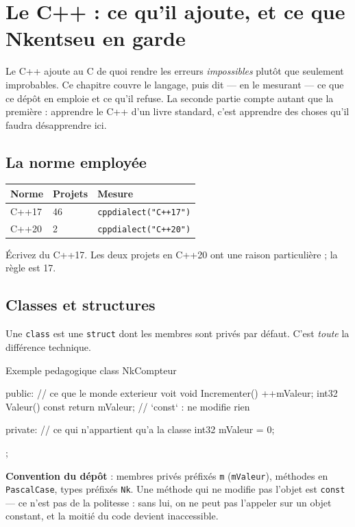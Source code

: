 \chapter{Le C++ : ce qu'il ajoute, et ce que Nkentseu en garde}

Le C++ ajoute au C de quoi rendre les erreurs \emph{impossibles} plutôt que
seulement improbables. Ce chapitre couvre le langage, puis dit --- en le mesurant
--- ce que ce dépôt en emploie et ce qu'il refuse. La seconde partie compte
autant que la première : apprendre le C++ d'un livre standard, c'est apprendre
des choses qu'il faudra désapprendre ici.

\section{La norme employée}

\begin{center}
\begin{tabular}{@{}lll@{}}
\toprule
\textbf{Norme} & \textbf{Projets} & \textbf{Mesure} \\
\midrule
C++17 & 46 & \texttt{cppdialect("C++17")} \\
C++20 & 2  & \texttt{cppdialect("C++20")} \\
\bottomrule
\end{tabular}
\end{center}

Écrivez du C++17. Les deux projets en C++20 ont une raison particulière ; la
règle est 17.

\section{Classes et structures}

Une \texttt{class} est une \texttt{struct} dont les membres sont privés par
défaut. C'est \emph{toute} la différence technique.

\begin{nkcode}{Exemple pedagogique}
class NkCompteur {
    public:                            // ce que le monde exterieur voit
        void Incrementer() { ++mValeur; }
        int32 Valeur() const { return mValeur; }   // `const` : ne modifie rien

    private:                           // ce qui n'appartient qu'a la classe
        int32 mValeur = 0;
};
\end{nkcode}

\begin{nkretenir}
\textbf{Convention du dépôt} : membres privés préfixés \texttt{m}
(\texttt{mValeur}), méthodes en \texttt{PascalCase}, types préfixés \texttt{Nk}.
Une méthode qui ne modifie pas l'objet est \texttt{const} --- ce n'est pas de la
politesse : sans lui, on ne peut pas l'appeler sur un objet constant, et la
moitié du code devient inaccessible.
\end{nkretenir}

